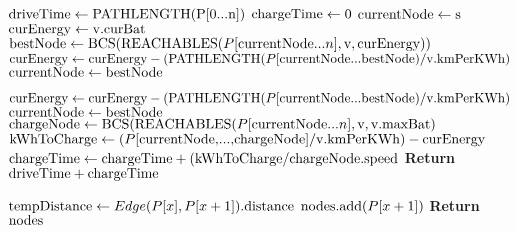 \begin{algorithm}
\begin{algorithmic}[H]
	\State $\textnormal{driveTime} \gets \textnormal{PATHLENGTH(P[0...n])}$
	\State $\textnormal{chargeTime} \gets 0$	
	\State $\textnormal{currentNode} \gets \textnormal{s}$
  \State $\textnormal{curEnergy} \gets \textnormal{v.curBat}$
    \State $\textnormal{bestNode} \gets \textnormal{BCS}(\textnormal{REACHABLES}(P[\textnormal{currentNode}...n], \textnormal{v},\textnormal{curEnergy}))$
      \State $\textnormal{curEnergy} \gets \textnormal{curEnergy} - (\textnormal{PATHLENGTH}(P[\textnormal{currentNode}...\textnormal{bestNode})/\textnormal{v.kmPerKWh})$
			\State $\textnormal{currentNode} \gets \textnormal{bestNode}$

      \State $\textnormal{curEnergy} \gets \textnormal{curEnergy} - (\textnormal{PATHLENGTH}(P[\textnormal{currentNode}...\textnormal{bestNode})/\textnormal{v.kmPerKWh})$
			\State $\textnormal{currentNode} \gets \textnormal{bestNode}$
		\Else
			\State $\textnormal{chargeNode} \gets \textnormal{BCS}(
					\textnormal{REACHABLES}(P[\textnormal{currentNode}...n], \textnormal{v}, \textnormal{v.maxBat})$
			\State $\textnormal{kWhToCharge} \gets (P[\textnormal{currentNode,...,chargeNode}] / \textnormal{v.kmPerKWh}) - \textnormal{curEnergy}$
			\State $\textnormal{chargeTime} \gets \textnormal{chargeTime} + (\textnormal{kWhToCharge} / \textnormal{chargeNode.speed}$
		\EndIf
	\EndWhile
	\State \textbf{Return} $\textnormal{driveTime} + \textnormal{chargeTime}$
\EndProcedure
\end{algorithmic}
\label{alg:fastestpath}
\end{algorithm}

\begin{algorithm}
\begin{algorithmic}[1]
		\State $\textnormal{tempDistance} \gets Edge(P[x], P[x+1]).\textnormal{distance}$
			\State $\textnormal{nodes.add}(P[x+1])$
		\EndIf	
	\EndFor
	\State \textbf{Return} $\textnormal{nodes}$
\EndProcedure
\end{algorithmic}
\end{algorithm}


